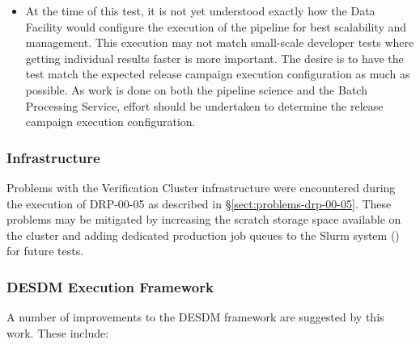 \documentclass[DM,lsstdraft,STR,toc]{lsstdoc}
\begin{document}
\begin{itemize}
  \item{
    At the time of this test, it is not yet understood exactly how the Data Facility would configure the execution of the pipeline for best scalability and management.
    This execution may not match small-scale developer tests where getting individual results faster is more important.
    The desire is to have the test match the expected release campaign execution configuration
  as much as possible.
    As work is done on both the pipeline science and the Batch Processing Service, effort should be undertaken to determine the release campaign execution configuration.
  }

\end{itemize}

\subsubsection{Infrastructure}

Problems with the Verification Cluster infrastructure were encountered during the execution of DRP-00-05 as described in \S\ref{sect:problems-drp-00-05}.
These problems may be mitigated by increasing the scratch storage space available on the cluster and adding dedicated production job queues to the Slurm system () for future tests.

\subsubsection{DESDM Execution Framework}

A number of improvements to the DESDM framework are suggested by this work.
These include:
\end{document}
